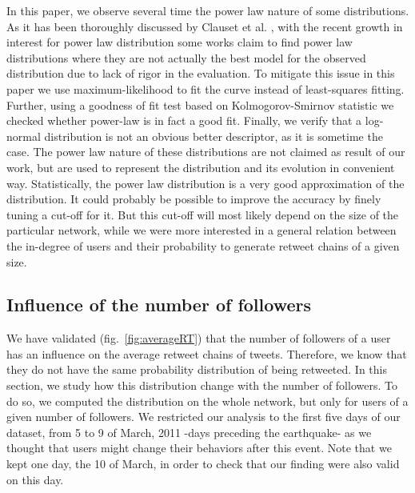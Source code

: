 \documentclass[conference]{IEEEtran}
\begin{document}
In this paper, we observe several time the power law nature of some distributions. As it has been thoroughly discussed by Clauset et al. \cite{clauset2009power}, with the recent growth in interest for power law distribution some works claim to find power law distributions where they are not actually the best model for the observed distribution due to lack of rigor in the evaluation. To mitigate this issue in this paper we use maximum-likelihood to fit the curve instead of least-squares fitting. Further, using a goodness of fit test based on Kolmogorov-Smirnov statistic we checked whether power-law is in fact a good fit. Finally, we verify that a log-normal distribution is not an obvious better descriptor, as it is sometime the case. The power law nature of these distributions are not claimed as result of our work, but are used to represent the distribution and its evolution in convenient way. Statistically, the power law distribution is a very good approximation of the distribution. It could probably be possible to improve the accuracy by finely tuning a cut-off for it. But this cut-off will most likely depend on the size of the particular network, while we were more interested in a general relation between the in-degree of users and their probability to generate retweet chains of a given size.

\subsection{Influence of the number of followers}
We have validated (fig.~\ref{fig:averageRT}) that the number of followers of a user has an influence on the average retweet chains of tweets. Therefore, we know that they do not have the same probability distribution of being retweeted. In this section, we study how this distribution change with the number of followers.
To do so, we computed the distribution on the whole network, but only for users of a given number of followers. We restricted our analysis to the first five days of our dataset, from 5 to 9 of March, 2011 -days preceding the earthquake- as we thought that users might change their behaviors  after this event. Note that we kept one day, the 10 of March, in order to check that our finding were also valid on this day.
\end{document}
